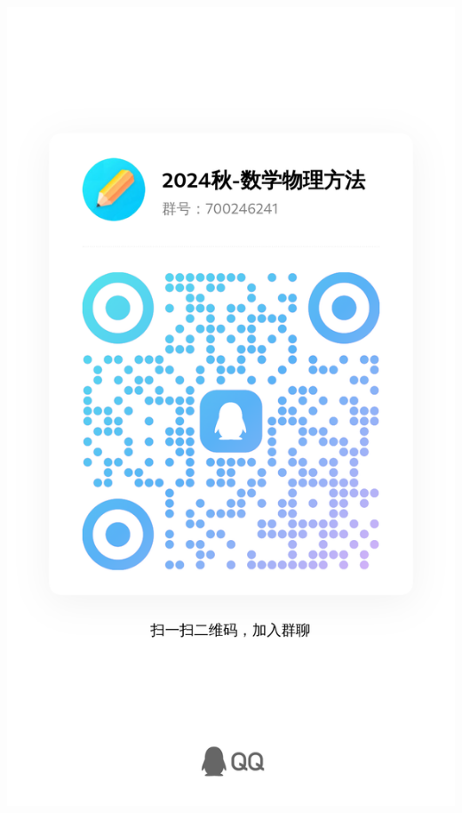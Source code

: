 \documentclass[11pt, a4paper]{article}
\begin{document}
\begin{center} 
	\begin{minipage}{2.5in}
		\begin{flushleft}
			\includegraphics[width=\textwidth]{qrcode.jpg}
		\end{flushleft}
	\end{minipage}
\end{center}





\end{document}
